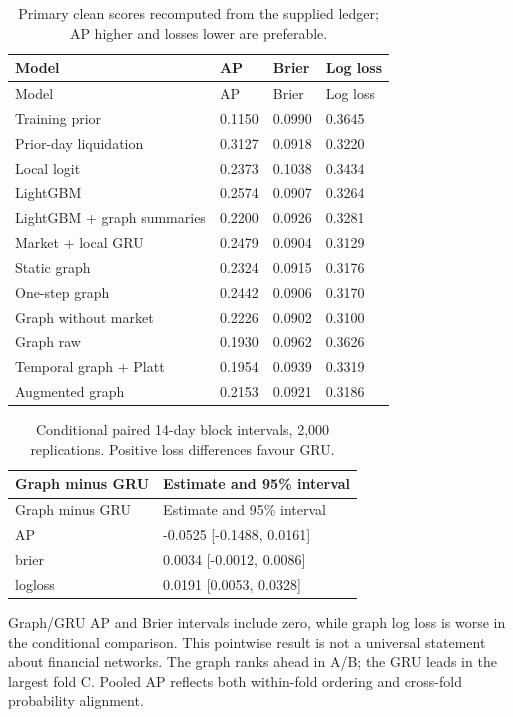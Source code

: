 \documentclass[
  10pt,
  a4paper,
]{article}
\begin{document}
\begin{longtable}[]{@{}llll@{}}
\caption{Primary clean scores recomputed from the supplied ledger; AP
higher and losses lower are preferable.}\tabularnewline
\toprule\noalign{}
Model & AP & Brier & Log loss \\
\midrule\noalign{}
\endfirsthead
\toprule\noalign{}
Model & AP & Brier & Log loss \\
\midrule\noalign{}
\endhead
\bottomrule\noalign{}
\endlastfoot
Training prior & 0.1150 & 0.0990 & 0.3645 \\
Prior-day liquidation & 0.3127 & 0.0918 & 0.3220 \\
Local logit & 0.2373 & 0.1038 & 0.3434 \\
LightGBM & 0.2574 & 0.0907 & 0.3264 \\
LightGBM + graph summaries & 0.2200 & 0.0926 & 0.3281 \\
Market + local GRU & 0.2479 & 0.0904 & 0.3129 \\
Static graph & 0.2324 & 0.0915 & 0.3176 \\
One-step graph & 0.2442 & 0.0906 & 0.3170 \\
Graph without market & 0.2226 & 0.0902 & 0.3100 \\
Graph raw & 0.1930 & 0.0962 & 0.3626 \\
Temporal graph + Platt & 0.1954 & 0.0939 & 0.3319 \\
Augmented graph & 0.2153 & 0.0921 & 0.3186 \\
\end{longtable}

\begin{longtable}[]{@{}ll@{}}
\caption{Conditional paired 14-day block intervals, 2,000 replications.
Positive loss differences favour GRU.}\tabularnewline
\toprule\noalign{}
Graph minus GRU & Estimate and 95\% interval \\
\midrule\noalign{}
\endfirsthead
\toprule\noalign{}
Graph minus GRU & Estimate and 95\% interval \\
\midrule\noalign{}
\endhead
\bottomrule\noalign{}
\endlastfoot
AP & -0.0525 {[}-0.1488, 0.0161{]} \\
brier & 0.0034 {[}-0.0012, 0.0086{]} \\
logloss & 0.0191 {[}0.0053, 0.0328{]} \\
\end{longtable}

Graph/GRU AP and Brier intervals include zero, while graph log loss is
worse in the conditional comparison. This pointwise result is not a
universal statement about financial networks. The graph ranks ahead in
A/B; the GRU leads in the largest fold C. Pooled AP reflects both
within-fold ordering and cross-fold probability alignment.
\end{document}
